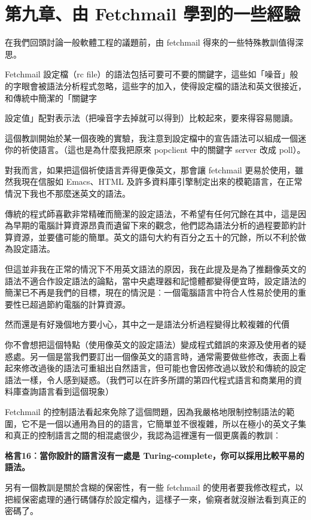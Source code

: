 \documentclass[12pt,]{article}
\makeatletter
\newcommand*{\shifttext}[2]{%
  \settowidth{\@tempdima}{#2}%
  \makebox[\@tempdima]{\hspace*{#1}#2}%
}
\makeatother
\begin{document}
\newpage
\section{第九章、由 Fetchmail 學到的一些經驗}

在我們回頭討論一般軟體工程的議題前，由 fetchmail
得來的一些特殊教訓值得深思。

Fetchmail 設定檔（rc
file）的語法包括可要可不要的關鍵字，這些如「噪音」般的字眼會被語法分析程式忽略，這些字的加入，使得設定檔的語法和英文很接近，和傳統中簡潔的「關鍵字
\shifttext{1pt}{---}\shifttext{-1pt}{---}
設定值」配對表示法（把噪音字去掉就可以得到）比較起來，要來得容易閱讀。

這個教訓開始於某一個夜晚的實驗，我注意到設定檔中的宣告語法可以組成一個迷你的祈使語言。（這也是為什麼我把原來
popclient 中的關鍵字 server 改成 poll）。

對我而言，如果把這個祈使語言弄得更像英文，那會讓 fetchmail
更易於使用，雖然我現在信服如 Emacs、HTML
及許多資料庫引擎制定出來的模範語言，在正常情況下我也不那麼迷英文的語法。

傳統的程式師喜歡非常精確而簡潔的設定語法，不希望有任何冗餘在其中，這是因為早期的電腦計算資源昂貴而遺留下來的觀念，他們認為語法分析的過程要節約計算資源，並要儘可能的簡單。英文的語句大約有百分之五十的冗餘，所以不利於做為設定語法。

但這並非我在正常的情況下不用英文語法的原因，我在此提及是為了推翻像英文的語法不適合作設定語法的論點，當中央處理器和記憶體都變得便宜時，設定語法的簡潔已不再是我們的目標，現在的情況是︰一個電腦語言中符合人性易於使用的重要性已超過節約電腦的計算資源。

然而還是有好幾個地方要小心，其中之一是語法分析過程變得比較複雜的代價
\shifttext{1pt}{---}\shifttext{-1pt}{---}
你不會想把這個特點（使用像英文的設定語法）變成程式錯誤的來源及使用者的疑惑處。另一個是當我們要訂出一個像英文的語言時，通常需要做些修改，表面上看起來修改過後的語法可重組出自然語言，但可能也會因修改過以致於和傳統的設定語法一樣，令人感到疑惑。（我們可以在許多所謂的第四代程式語言和商業用的資料庫查詢語言看到這個現象）

Fetchmail
的控制語法看起來免除了這個問題，因為我嚴格地限制控制語法的範圍，它不是一個以通用為目的的語言，它簡單並不很複雜，所以在極小的英文子集和真正的控制語言之間的相混處很少，我認為這裡還有一個更廣義的教訓︰

\textbf{格言16︰當你設計的語言沒有一處是
Turing-complete，你可以採用比較平易的語法。}

另有一個教訓是關於含糊的保密性，有一些 fetchmail
的使用者要我修改程式，以把經保密處理的通行碼儲存於設定檔內，這樣子一來，偷窺者就沒辦法看到真正的密碼了。
\end{document}
